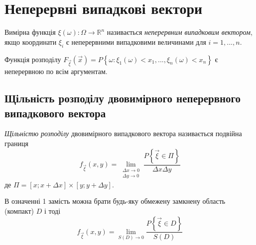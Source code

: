 \section{Неперервні випадкові вектори}

\begin{definition}
    Вимірна функція $\xi(\omega): \Omega \rightarrow \mathbb{R}^n$ називається 
    \emph{неперервним випадковим вектором}, якщо координати $\xi_i$ є 
    неперервними випадковими величинами для $i = 1,...,n$.
\end{definition}
Функція розподілу $F_{\vec{\xi}}\left(\vec{x}\right) = 
P\left\{\omega:\xi_1(\omega)<x_1,...,\xi_n(\omega)<x_n\right\}$ є неперервною по всім аргументам.

\subsection{Щільність розподілу двовимірного неперервного випадкового вектора}
\begin{definition}
    \emph{Щільністю розподілу} двовимірного випадкового вектора називається 
    подвійна границя
    \begin{equation}
        f_{\vec{\xi}}(x, y) = \lim_{\substack{\Delta x \to 0 \\ 
        \Delta y \to 0}} \frac{P\left\{\vec{\xi} \in \Pi\right\}}
        {\Delta x \Delta y}
    \end{equation}
    де $\Pi = \left[x; x+\Delta x\right] \times \left[y; y+\Delta y\right]$.
\end{definition}
\begin{remark}
    В означенні 1 замість можна брати будь-яку обмежену замкнену область (компакт) 
    $D$ і тоді
    \begin{equation*}
        f_{\vec{\xi}}(x, y) = \lim_{S(D) \to 0} 
        \frac{P\left\{\vec{\xi} \in D\right\}}
        {S(D)}
    \end{equation*}
\end{remark}

